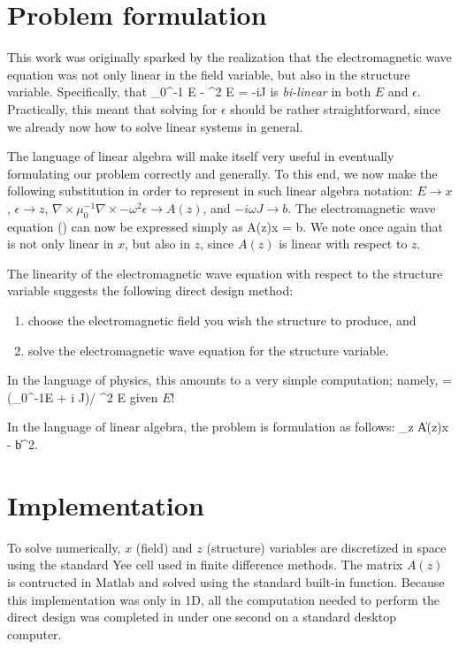 \section{Problem formulation}
This work was originally sparked by the realization that 
    the electromagnetic wave equation was not only linear in the field variable,
    but also in the structure variable.
Specifically, that
    \BE \nabla \times \mu_0^{-1} \nabla \times E - \omega^2 \epsilon E = 
        -i\omega J \label{p1:wave} \EE
    is \emph{bi-linear} in both $E$ and $\epsilon$.
Practically, this meant that solving for $\epsilon$ should be rather straightforward,
    since we already now how to solve linear systems in general.

The language of linear algebra will make itself very useful
    in eventually formulating our problem correctly and generally.
To this end, we now make the following substitution in order to represent 
    in such linear algebra notation:
    \BI $E \to x$, 
    \I  $\epsilon \to z$,
    \I  $\nabla\times\mu_0^{-1}\nabla\times - \omega^2 \epsilon \to A(z)$, and
    \I  $-i\omega J \to b$. \EI
The electromagnetic wave equation () can now be expressed simply as
    \BE A(z)x = b. \label{p1:axb} \EE
We note once again that  is not only linear in $x$, but also in $z$, 
    since $A(z)$ is linear with respect to $z$.

The linearity of the electromagnetic wave equation with respect to
    the structure variable suggests the following direct design method:
    \begin{enumerate}
    \item choose the electromagnetic field you wish the structure to produce, and
    \item solve the electromagnetic wave equation for the structure variable. 
    \end{enumerate}

In the language of physics, this amounts to a very simple computation;
    namely,
    \BE \epsilon = (\nabla\times\mu_0^{-1}\nabla\times E + 
        i \omega J)/ \omega^2 E \EE
    given $E$! 

In the language of linear algebra, the problem is formulation as follows:
    \BE \minimize_z \|A(z)x - b\|^2. \label{p1:problem}\EE
    
\section{Implementation}
To solve  numerically, $x$ (field) and $z$ (structure) variables
    are discretized in space using the standard Yee cell 
    used in finite difference methods\cite{Yee66}. 
The matrix $A(z)$ is contructed in Matlab and solved using 
    the standard built-in function.
Because this implementation was only in 1D,
    all the computation needed to perform the direct design
    was completed in under one second 
    on a standard desktop computer.

